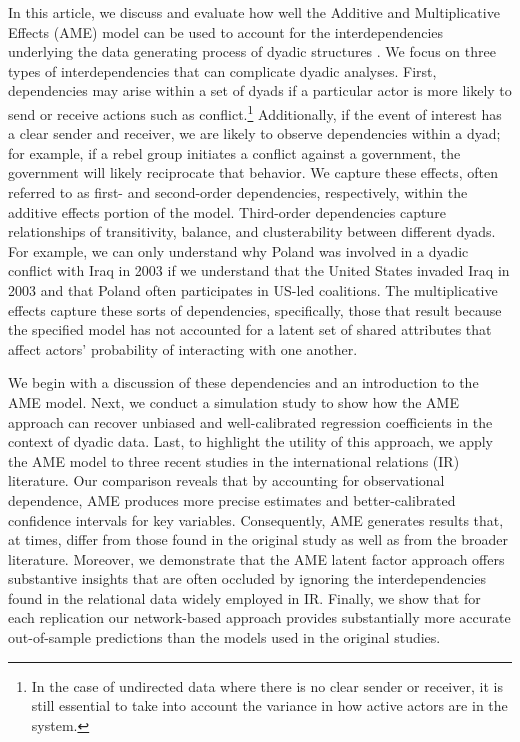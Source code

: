In this article, we discuss and evaluate how well the Additive and Multiplicative Effects (AME) model can be used to account for the interdependencies underlying the data generating process of dyadic structures \citep{hoff:2008,minhas:etal:2019}. We focus on three types of interdependencies that can complicate dyadic analyses. First, dependencies may arise within a set of dyads if a particular actor is more likely to send or receive actions such as conflict.\footnote{In the case of undirected data where there is no clear sender or receiver, it is still essential to take into account the variance in how active actors are in the system.} Additionally, if the event of interest has a clear sender and receiver, we are likely to observe dependencies within a dyad; for example, if a rebel group initiates a conflict against a government, the government will likely reciprocate that behavior. We capture these effects, often referred to as first- and second-order dependencies, respectively, within the additive effects portion of the model. Third-order dependencies capture relationships of transitivity, balance, and clusterability between different dyads. For example, we can only understand why Poland was involved in a dyadic conflict with Iraq in 2003 if we understand that the United States invaded Iraq in 2003 and that Poland often participates in US-led coalitions. The multiplicative effects capture these sorts of dependencies, specifically, those that result because the specified model has not accounted for a latent set of shared attributes that affect actors' probability of interacting with one another.

We begin with a discussion of these dependencies and an introduction to the AME model. Next, we conduct a simulation study to show how the AME approach can recover unbiased and well-calibrated regression coefficients in the context of dyadic data. Last, to highlight the utility of this approach, we apply the AME model to three recent studies in the international relations (IR) literature. Our comparison reveals that by accounting for observational dependence, AME produces more precise estimates and better-calibrated confidence intervals for key variables. Consequently, AME generates results that, at times, differ from those found in the original study as well as from the broader literature. Moreover, we demonstrate that the AME latent factor approach offers substantive insights that are often occluded by ignoring the interdependencies found in the relational data widely employed in IR. Finally, we show that for each replication our network-based approach provides substantially more accurate out-of-sample predictions than the models used in the original studies.


